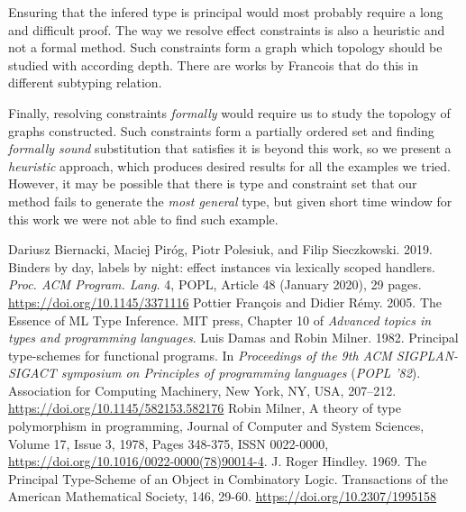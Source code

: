 \documentclass[declaration,shortabstract]{iithesis}
\begin{document}
Ensuring that the infered type is principal would most probably require a long
and difficult proof. The way we resolve effect constraints is also a heuristic
and not a formal method. Such constraints form a graph which topology should be
studied with according depth. There are works by Francois that do this in different
subtyping relation.

Finally, resolving constraints \textit{formally} would require us to study
the topology of graphs constructed.
Such constraints form a partially ordered set and finding \textit{formally sound}
substitution that satisfies it is beyond this work, so we present
a  \textit{heuristic} approach, which produces desired results for all the examples we tried.
However, it may be possible that there is type and constraint set that our method
fails to generate the \textit{most general} type, but given short time window for
this work we were not able to find such example.


\begin{thebibliography}{1}
    Dariusz Biernacki, Maciej Piróg, Piotr Polesiuk, and Filip Sieczkowski. 2019. Binders by day, labels by night: effect instances via lexically scoped handlers. \textit{Proc. ACM Program. Lang.} 4, POPL, Article 48 (January 2020), 29 pages. \url{https://doi.org/10.1145/3371116}
    Pottier François and Didier Rémy. 2005.
    The Essence of ML Type Inference.
    MIT press, Chapter 10 of \textit{Advanced topics in types and programming languages}.
    Luis Damas and Robin Milner. 1982. Principal type-schemes for functional programs. In \textit{Proceedings of the 9th ACM SIGPLAN-SIGACT symposium on Principles of programming languages} (\textit{POPL '82}). Association for Computing Machinery, New York, NY, USA, 207–212. \url{https://doi.org/10.1145/582153.582176}
    Robin Milner,
    A theory of type polymorphism in programming,
    Journal of Computer and System Sciences,
    Volume 17, Issue 3,
    1978,
    Pages 348-375,
    ISSN 0022-0000,
     \url{https://doi.org/10.1016/0022-0000(78)90014-4}.
    J. Roger Hindley. 1969. The Principal Type-Scheme of an Object in Combinatory Logic. Transactions of the American Mathematical Society, 146, 29-60. \url{https://doi.org/10.2307/1995158}


    
\end{thebibliography}
\end{document}
